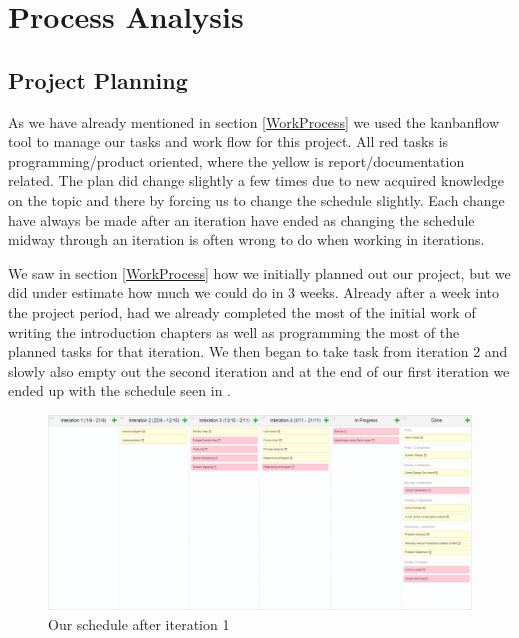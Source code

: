 \chapter{Process Analysis}


\section{Project Planning}
\label{ProjectPlanning}
As we have already mentioned in section \ref{WorkProcess} we used the kanbanflow tool to manage our tasks and work flow for this project. All red tasks is programming/product oriented, where the yellow is report/documentation related. The plan did change slightly a few times due to new acquired knowledge on the topic and there by forcing us to change the schedule slightly. Each change have always be made after an iteration have ended as changing the schedule midway through an iteration is often wrong to do when working in iterations.

We saw in section \ref{WorkProcess} how we initially planned out our project, but we did under estimate how much we could do in 3 weeks. Already after a week into the project period, had we already completed the most of the initial work of writing the introduction chapters as well as programming the most of the planned tasks for that iteration. We then began to take task from iteration 2 and slowly also empty out the second iteration and at the end of our first iteration we ended up with the schedule seen in .

\begin{figure}[H]
	\includegraphics[width=1.0\linewidth]{img/afteriteration1}
	\centering
	\caption{Our schedule after iteration 1}
	\label{fig:afteritration1}
\end{figure}

